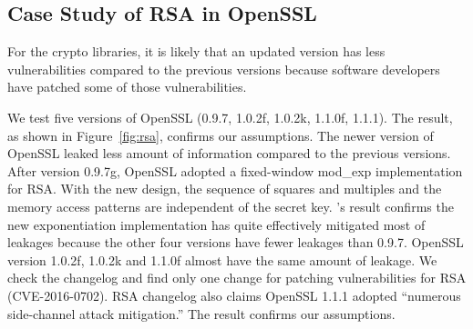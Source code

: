 \subsection{Case Study of RSA in OpenSSL} \label{sec::eval_rsa}
For the crypto libraries, it is likely that an updated version has less
vulnerabilities compared to the previous versions because software developers
have patched some of those vulnerabilities.

We test five versions of OpenSSL (0.9.7, 1.0.2f, 1.0.2k, 1.1.0f, 1.1.1). The
result, as shown in Figure~\ref{fig:rsa}, confirms our assumptions. The newer
version of OpenSSL leaked less amount of information compared to the previous
versions. After version 0.9.7g, OpenSSL adopted a fixed-window mod\_exp
implementation for RSA\@. With the new design, the sequence of squares and
multiples and the memory access patterns are independent of the secret key.
\tool{}'s result confirms the new exponentiation implementation has quite
effectively mitigated most of leakages because the other four versions have fewer
leakages than 0.9.7. OpenSSL version 1.0.2f, 1.0.2k and 1.1.0f almost have the
same amount of leakage. We check the changelog and find only one change for
patching vulnerabilities for RSA (CVE-2016-0702). RSA changelog also claims
OpenSSL 1.1.1 adopted ``numerous side-channel attack mitigation.'' The result
confirms our assumptions.

